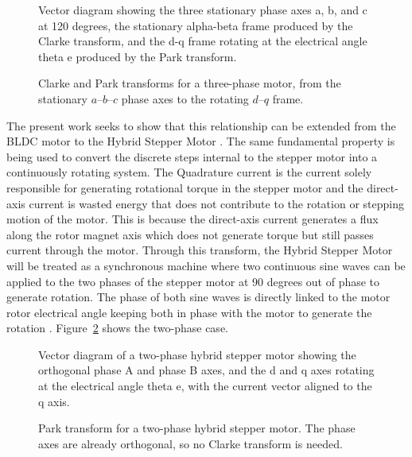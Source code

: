 \begin{figure}[htbp]
	\centering
		{Vector diagram showing the three stationary phase axes a, b, and c at 120 degrees, the stationary alpha-beta frame produced by the Clarke transform, and the d-q frame rotating at the electrical angle theta e produced by the Park transform.}
	\caption[Clarke and Park transforms for a three-phase motor]{Clarke and Park transforms for a three-phase motor, from the stationary $a$--$b$--$c$ phase axes to the rotating $d$--$q$ frame.}
	\label{fig:park_bldc}
\end{figure}

The present work seeks to show that this relationship can be extended from the BLDC motor to the Hybrid Stepper Motor \cite{lai_modelling_2018,ricci_simple_2018,bernardi_performance_2022,derammelaere_linear_2010}. The same fundamental property is being used to convert the discrete steps internal to the stepper motor into a continuously rotating system. The Quadrature current is the current solely responsible for generating rotational torque in the stepper motor and the direct-axis current is wasted energy that does not contribute to the rotation or stepping motion of the motor. This is because the direct-axis current generates a flux along the rotor magnet axis which does not generate torque but still passes current through the motor. Through this transform, the Hybrid Stepper Motor will be treated as a synchronous machine where two continuous sine waves can be applied to the two phases of the stepper motor at 90 degrees out of phase to generate rotation. The phase of both sine waves is directly linked to the motor rotor electrical angle keeping both in phase with the motor to generate the rotation \cite{derammelaere_linear_2010,bernardi_performance_2022,lai_modelling_2018}. Figure~\ref{fig:two_phase_dq} shows the two-phase case. 

\begin{figure}[htbp]
	\centering
		{Vector diagram of a two-phase hybrid stepper motor showing the orthogonal phase A and phase B axes, and the d and q axes rotating at the electrical angle theta e, with the current vector aligned to the q axis.}
	\caption[Park transform for a two-phase stepper motor]{Park transform for a two-phase hybrid stepper motor. The phase axes are already orthogonal, so no Clarke transform is needed.}
	\label{fig:two_phase_dq}
\end{figure}

